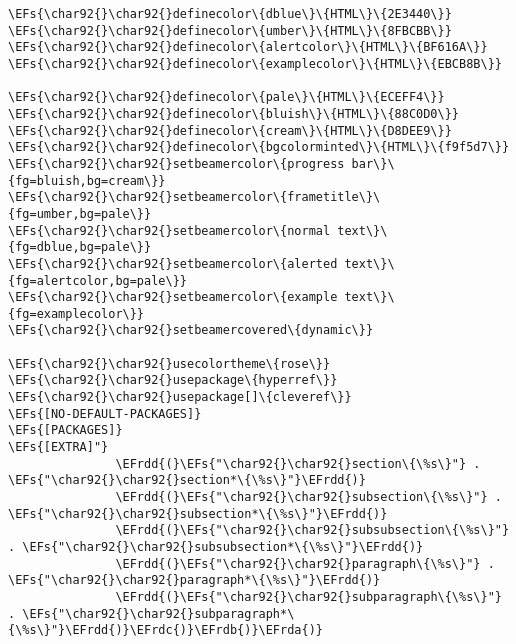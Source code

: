 \documentclass[c]{article}
\theoremstyle{plain}%
\theoremstyle{definition}
\theoremstyle{remark}
\newcommand{\EFs}[1]{\textcolor{EFs}{#1}} %
\newcommand{\EFrda}[1]{\textcolor{EFrda}{#1}} %
\newcommand{\EFrdb}[1]{\textcolor{EFrdb}{#1}} %
\newcommand{\EFrdc}[1]{\textcolor{EFrdc}{#1}} %
\newcommand{\EFrdd}[1]{\textcolor{EFrdd}{#1}} %
\begin{document}
\begin{Code}
\begin{Verbatim}
\EFs{\char92{}\char92{}definecolor\{dblue\}\{HTML\}\{2E3440\}}
\EFs{\char92{}\char92{}definecolor\{umber\}\{HTML\}\{8FBCBB\}}
\EFs{\char92{}\char92{}definecolor\{alertcolor\}\{HTML\}\{BF616A\}}
\EFs{\char92{}\char92{}definecolor\{examplecolor\}\{HTML\}\{EBCB8B\}}

\EFs{\char92{}\char92{}definecolor\{pale\}\{HTML\}\{ECEFF4\}}
\EFs{\char92{}\char92{}definecolor\{bluish\}\{HTML\}\{88C0D0\}}
\EFs{\char92{}\char92{}definecolor\{cream\}\{HTML\}\{D8DEE9\}}
\EFs{\char92{}\char92{}definecolor\{bgcolorminted\}\{HTML\}\{f9f5d7\}}
\EFs{\char92{}\char92{}setbeamercolor\{progress bar\}\{fg=bluish,bg=cream\}}
\EFs{\char92{}\char92{}setbeamercolor\{frametitle\}\{fg=umber,bg=pale\}}
\EFs{\char92{}\char92{}setbeamercolor\{normal text\}\{fg=dblue,bg=pale\}}
\EFs{\char92{}\char92{}setbeamercolor\{alerted text\}\{fg=alertcolor,bg=pale\}}
\EFs{\char92{}\char92{}setbeamercolor\{example text\}\{fg=examplecolor\}}
\EFs{\char92{}\char92{}setbeamercovered\{dynamic\}}

\EFs{\char92{}\char92{}usecolortheme\{rose\}}
\EFs{\char92{}\char92{}usepackage\{hyperref\}}
\EFs{\char92{}\char92{}usepackage[]\{cleveref\}}
\EFs{[NO-DEFAULT-PACKAGES]}
\EFs{[PACKAGES]}
\EFs{[EXTRA]"}
               \EFrdd{(}\EFs{"\char92{}\char92{}section\{\%s\}"} . \EFs{"\char92{}\char92{}section*\{\%s\}"}\EFrdd{)}
               \EFrdd{(}\EFs{"\char92{}\char92{}subsection\{\%s\}"} . \EFs{"\char92{}\char92{}subsection*\{\%s\}"}\EFrdd{)}
               \EFrdd{(}\EFs{"\char92{}\char92{}subsubsection\{\%s\}"} . \EFs{"\char92{}\char92{}subsubsection*\{\%s\}"}\EFrdd{)}
               \EFrdd{(}\EFs{"\char92{}\char92{}paragraph\{\%s\}"} . \EFs{"\char92{}\char92{}paragraph*\{\%s\}"}\EFrdd{)}
               \EFrdd{(}\EFs{"\char92{}\char92{}subparagraph\{\%s\}"} . \EFs{"\char92{}\char92{}subparagraph*\{\%s\}"}\EFrdd{)}\EFrdc{)}\EFrdb{)}\EFrda{)}
\end{Verbatim}
\end{Code}
\end{document}
